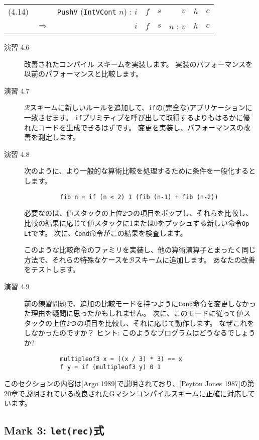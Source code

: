 \documentclass{jarticle}
\begin{document}
\begin{tabular} {|c|l r l r r l l|} \hline
	(4.14) &                   & \texttt{PushV} (\texttt{IntVCont} $n$) : $i$ & $f$ & $s$ & $v$       & $h$ & $c$ \\
	       & $\Longrightarrow$ & $i$                                          & $f$ & $s$ & $n$ : $v$ & $h$ & $c$ \\ \hline
\end{tabular}

\begin{description}
	\item[演習 4.6] 改善されたコンパイル スキームを実装します。
		実装のパフォーマンスを以前のパフォーマンスと比較します。
	\item[演習 4.7] $\mathcal{R}$スキームに新しいルールを追加して、\texttt{if}の(完全な)アプリケーションに一致させます。
		\texttt{if}プリミティブを呼び出して取得するよりもはるかに優れたコードを生成できるはずです。
		変更を実装し、パフォーマンスの改善を測定します。
	\item[演習 4.8] 次のように、より一般的な算術比較を処理するために条件を一般化するとします。
		\begin{verbatim}
          fib n = if (n < 2) 1 (fib (n-1) + fib (n-2))
        \end{verbatim}
		必要なのは、値スタックの上位2つの項目をポップし、それらを比較し、比較の結果に応じて値スタックに1または0をプッシュする新しい命令\texttt{Op Lt}です。
		次に、\texttt{Cond}命令がこの結果を検査します。

		このような比較命令のファミリを実装し、他の算術演算子とまったく同じ方法で、それらの特殊なケースを$\mathcal{B}$スキームに追加します。
		あなたの改善をテストします。
	\item[演習 4.9] 前の練習問題で、追加の比較モードを持つように\texttt{Cond}命令を変更しなかった理由を疑問に思ったかもしれません。
		次に、このモードに従って値スタックの上位2つの項目を比較し、それに応じて動作します。
		なぜこれをしなかったのですか？
		ヒント: このようなプログラムはどうなるでしょうか?
		\begin{verbatim}
          multipleof3 x = ((x / 3) * 3) == x
          f y = if (multipleof3 y) 0 1
        \end{verbatim}
\end{description}
このセクションの内容は[Argo 1989]で説明されており、[Peyton Jones 1987]の第20章で説明されている改良されたGマシンコンパイルスキームに正確に対応しています。
\newpage

\subsection{Mark 3: \texttt{let(rec)}式}
\end{document}
